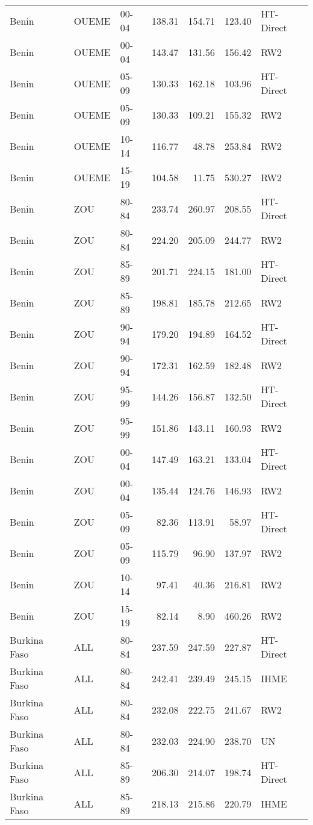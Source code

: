 \begin{longtable}{lllrrrl}
  Benin & OUEME & 00-04 & 138.31 & 154.71 & 123.40 & HT-Direct \\ 
  Benin & OUEME & 00-04 & 143.47 & 131.56 & 156.42 & RW2 \\ 
  Benin & OUEME & 05-09 & 130.33 & 162.18 & 103.96 & HT-Direct \\ 
  Benin & OUEME & 05-09 & 130.33 & 109.21 & 155.32 & RW2 \\ 
  Benin & OUEME & 10-14 & 116.77 & 48.78 & 253.84 & RW2 \\ 
  Benin & OUEME & 15-19 & 104.58 & 11.75 & 530.27 & RW2 \\ 
  Benin & ZOU & 80-84 & 233.74 & 260.97 & 208.55 & HT-Direct \\ 
  Benin & ZOU & 80-84 & 224.20 & 205.09 & 244.77 & RW2 \\ 
  Benin & ZOU & 85-89 & 201.71 & 224.15 & 181.00 & HT-Direct \\ 
  Benin & ZOU & 85-89 & 198.81 & 185.78 & 212.65 & RW2 \\ 
  Benin & ZOU & 90-94 & 179.20 & 194.89 & 164.52 & HT-Direct \\ 
  Benin & ZOU & 90-94 & 172.31 & 162.59 & 182.48 & RW2 \\ 
  Benin & ZOU & 95-99 & 144.26 & 156.87 & 132.50 & HT-Direct \\ 
  Benin & ZOU & 95-99 & 151.86 & 143.11 & 160.93 & RW2 \\ 
  Benin & ZOU & 00-04 & 147.49 & 163.21 & 133.04 & HT-Direct \\ 
  Benin & ZOU & 00-04 & 135.44 & 124.76 & 146.93 & RW2 \\ 
  Benin & ZOU & 05-09 & 82.36 & 113.91 & 58.97 & HT-Direct \\ 
  Benin & ZOU & 05-09 & 115.79 & 96.90 & 137.97 & RW2 \\ 
  Benin & ZOU & 10-14 & 97.41 & 40.36 & 216.81 & RW2 \\ 
  Benin & ZOU & 15-19 & 82.14 & 8.90 & 460.26 & RW2 \\ 
  Burkina Faso & ALL & 80-84 & 237.59 & 247.59 & 227.87 & HT-Direct \\ 
  Burkina Faso & ALL & 80-84 & 242.41 & 239.49 & 245.15 & IHME \\ 
  Burkina Faso & ALL & 80-84 & 232.08 & 222.75 & 241.67 & RW2 \\ 
  Burkina Faso & ALL & 80-84 & 232.03 & 224.90 & 238.70 & UN \\ 
  Burkina Faso & ALL & 85-89 & 206.30 & 214.07 & 198.74 & HT-Direct \\ 
  Burkina Faso & ALL & 85-89 & 218.13 & 215.86 & 220.79 & IHME \\ 

\end{longtable}
